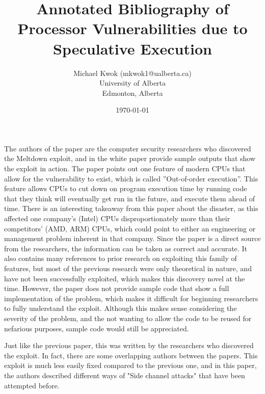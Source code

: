 \documentclass[11pt]{article}
\title{Annotated Bibliography of \\ Processor Vulnerabilities due to \\
Speculative Execution}
\author{Michael Kwok (mkwok1@ualberta.ca) \\ University of Alberta \\ Edmonton,
Alberta}
\date{\today}
\begin{document}
\pagestyle{headings}
\maketitle

\cite{Meltdown} 

The authors of the paper are the computer security researchers who discovered
the Meltdown exploit, and in the white paper provide sample outputs that show
the exploit in action. The paper points out one feature of modern CPUs that
allow for the vulnerability to exist, which is called ”Out-of-order execution”.
This feature allows CPUs to cut down on program execution time by running code
that they think will eventually get run in the future, and execute them ahead of
 time. There is an interesting takeaway from this paper about the disaster, as
 this affected one company’s (Intel) CPUs disproportionately more than their
 competitors’ (AMD, ARM) CPUs, which could point to either an engineering or
 management problem inherent in that company. Since the paper is a direct source
 from the researchers, the information can be taken as correct and accurate. It
 also contains many references to prior research on exploiting this family of
 features, but most of the previous research were only theoretical in nature,
 and have not been successfully exploited, which makes this discovery novel at
 the time. However, the paper does not provide sample code that show a full
 implementation of the problem, which makes it difficult for beginning
 researchers to fully understand the exploit. Although this makes sense
 considering the severity of the problem, and the not wanting to allow the code
 to be reused for nefarious purposes, sample code would still be appreciated.

\hfill

\cite{Spectre} 

Just like the previous paper, this was written by the researchers who
discovered the exploit. In fact, there are some overlapping authors between the
papers. This exploit is much less easily fixed compared to the previous one, and
in this paper, the authors described different ways of "Side channel attacks"
that have been attempted before.

\end{document}
